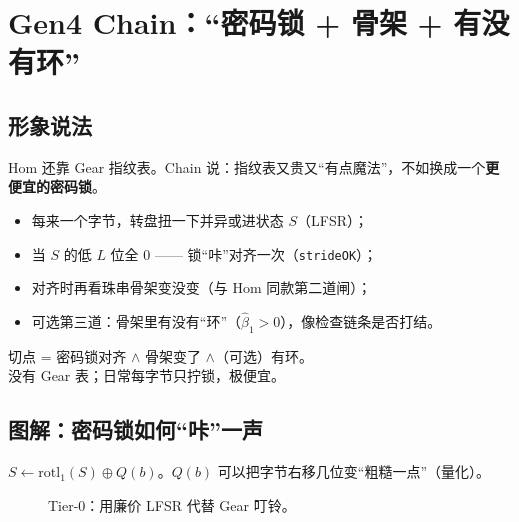 \chapter{Gen4 Chain：``密码锁 + 骨架 + 有没有环''}
\label{ch:chain-lock}

\section{形象说法}

Hom 还靠 Gear 指纹表。Chain 说：指纹表又贵又``有点魔法''，不如换成一个\textbf{更便宜的密码锁}。

\begin{metaphor}[老式自行车锁]
\begin{itemize}[nosep]
  \item 每来一个字节，转盘扭一下并异或进状态 $S$（LFSR）；
  \item 当 $S$ 的低 $L$ 位全 0 —— 锁``咔''对齐一次（\texttt{strideOK}）；
  \item 对齐时再看珠串骨架变没变（与 Hom 同款第二道闸）；
  \item 可选第三道：骨架里有没有``环''（$\hat\beta_1>0$），像检查链条是否打结。
\end{itemize}
\end{metaphor}

\begin{keyidea}[Chain]
切点 = 密码锁对齐 $\land$ 骨架变了 $\land$（可选）有环。\\
没有 Gear 表；日常每字节只拧锁，极便宜。
\end{keyidea}

\section{图解：密码锁如何``咔''一声}

$S \leftarrow \mathrm{rotl}_1(S)\oplus Q(b)$。$Q(b)$ 可以把字节右移几位变``粗糙一点''（量化）。

\begin{figure}[htbp]
\centering
{}
\caption{Tier-0：用廉价 LFSR 代替 Gear 叮铃。}
\label{fig:chain-lfsr-illust}
\end{figure}

